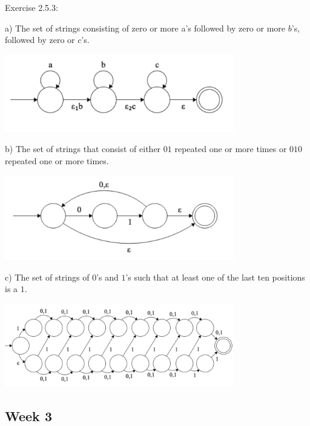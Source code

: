 \documentclass{article}
\theoremstyle{theorem}
\theoremstyle{definition}
\theoremstyle{remark}
\begin{document}
\medskip\noindent
Exercise 2.5.3:

\medskip\noindent
a) The set of strings consisting of zero or more a's followed by zero or more $b$'s, followed by zero or $c$'s.

\smallskip
\begin{center}
\includegraphics[width=0.75\textwidth]{Images/2.5.3a.png}
\end{center}

\medskip\noindent
b) The set of strings that consist of either $01$ repeated one or more times or $010$ repeated one or more times.

\medskip
\begin{center}
\includegraphics[width=0.75\textwidth]{Images/2.5.3b.png}
\end{center}

\medskip\noindent
c) The set of strings of $0$'s and $1$'s such that at least one of the last ten positions is a $1$.

\medskip
\begin{center}
\includegraphics[width=0.75\textwidth]{Images/2.5.3c.png}
\end{center}


\subsection{Week 3}
\end{document}
